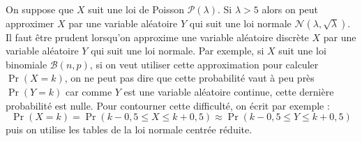 \documentclass[12pt, a4paper]{book}
\newtheorem{prop}[thm]{Propriété}
\numberwithin{equation}{section}
\begin{document}
 On suppose que $X$ suit une loi de
Poisson $\mathcal{P}(\lambda)$. Si $\lambda >5$ alors on peut approximer $X$ par une variable aléatoire $Y$
qui suit une loi normale $\mathcal{N}(\lambda,\sqrt{\lambda})$.\\

 Il faut être prudent lorsqu'on approxime une variable aléatoire discrète $X$ par
une
variable aléatoire $Y$ qui suit une loi normale. Par exemple, si $X$ suit une loi binomiale $\mathcal{B}(n,p)$, si
on veut utiliser cette approximation pour calculer
$\Pr(X=k)$, on ne peut pas dire que cette probabilité vaut à peu près $\Pr(Y=k)$ car comme $Y$ est une
variable aléatoire continue, cette dernière probabilité est nulle. Pour contourner cette difficulté, on écrit
par exemple :
$$
\Pr(X=k)=\Pr(k-0,5 \leq X \leq k+0,5) \approx \Pr( k-0,5 \leq Y \leq
k+0,5)
$$
puis on utilise les tables de la loi normale centrée réduite.


%
\end{document}
